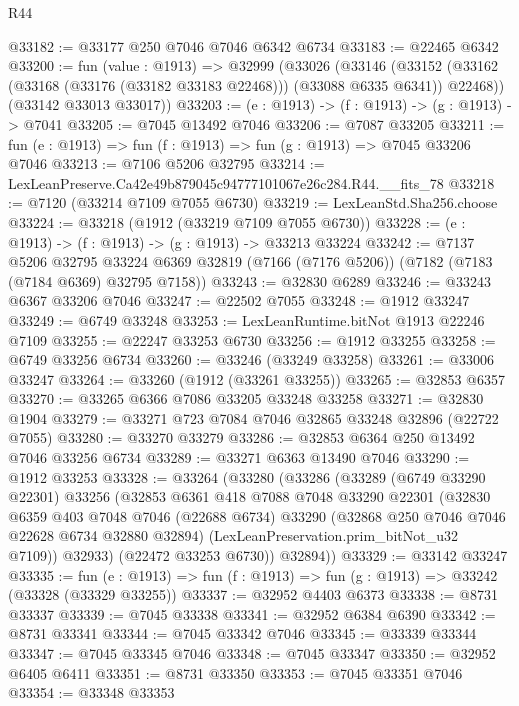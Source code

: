 \begin{lexlean}{R44}
\begin{coremodule}
{@33182 := @33177 @250 @7046 @7046 @6342 @6734
@33183 := @22465 @6342
@33200 := fun (value : @1913) =>
  @32999
    (@33026
      (@33146
        (@33152 (@33162 (@33168 (@33176 (@33182 @33183 @22468))) (@33088 @6335 @6341)) @22468))
      (@33142 @33013 @33017))
@33203 := (e : @1913) -> (f : @1913) -> (g : @1913) -> @7041
@33205 := @7045 @13492 @7046
@33206 := @7087 @33205
@33211 := fun (e : @1913) => fun (f : @1913) => fun (g : @1913) => @7045 @33206 @7046
@33213 := @7106 @5206 @32795
@33214 := LexLeanPreserve.Ca42e49b879045c94777101067e26c284.R44.__fits_78
@33218 := @7120 (@33214 @7109 @7055 @6730)
@33219 := LexLeanStd.Sha256.choose
@33224 := @33218 (@1912 (@33219 @7109 @7055 @6730))
@33228 := (e : @1913) -> (f : @1913) -> (g : @1913) -> @33213 @33224
@33242 := @7137
    @5206
    @32795
    @33224
    @6369
    @32819
    (@7166 (@7176 @5206))
    (@7182 (@7183 (@7184 @6369) @32795 @7158))
@33243 := @32830 @6289
@33246 := @33243 @6367 @33206 @7046
@33247 := @22502 @7055
@33248 := @1912 @33247
@33249 := @6749 @33248
@33253 := LexLeanRuntime.bitNot @1913 @22246 @7109
@33255 := @22247 @33253 @6730
@33256 := @1912 @33255
@33258 := @6749 @33256 @6734
@33260 := @33246 (@33249 @33258)
@33261 := @33006 @33247
@33264 := @33260 (@1912 (@33261 @33255))
@33265 := @32853 @6357
@33270 := @33265 @6366 @7086 @33205 @33248 @33258
@33271 := @32830 @1904
@33279 := @33271 @723 @7084 @7046 @32865 @33248 @32896 (@22722 @7055)
@33280 := @33270 @33279
@33286 := @32853 @6364 @250 @13492 @7046 @33256 @6734
@33289 := @33271 @6363 @13490 @7046
@33290 := @1912 @33253
@33328 := @33264
    (@33280
      (@33286
        (@33289
          (@6749 @33290 @22301)
          @33256
          (@32853
            @6361
            @418
            @7088
            @7048
            @33290
            @22301
            (@32830
              @6359
              @403
              @7048
              @7046
              (@22688 @6734)
              @33290
              (@32868 @250 @7046 @7046 @22628 @6734 @32880 @32894)
              (LexLeanPreservation.prim_bitNot_u32 @7109))
            @32933)
          (@22472 @33253 @6730))
        @32894))
@33329 := @33142 @33247
@33335 := fun (e : @1913) => fun (f : @1913) => fun (g : @1913) => @33242 (@33328 (@33329 @33255))
@33337 := @32952 @4403 @6373
@33338 := @8731 @33337
@33339 := @7045 @33338
@33341 := @32952 @6384 @6390
@33342 := @8731 @33341
@33344 := @7045 @33342 @7046
@33345 := @33339 @33344
@33347 := @7045 @33345 @7046
@33348 := @7045 @33347
@33350 := @32952 @6405 @6411
@33351 := @8731 @33350
@33353 := @7045 @33351 @7046
@33354 := @33348 @33353
}
\end{coremodule}
\end{lexlean}
